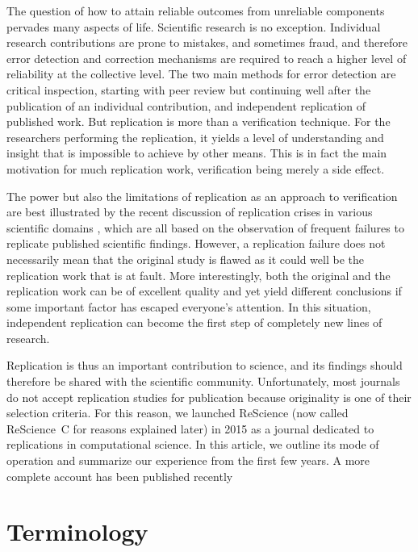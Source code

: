 \documentclass[runningheads]{llncs}
\begin{document}
The question of how to attain reliable outcomes from unreliable components pervades many aspects of life. Scientific research is no exception. Individual research contributions are prone to mistakes, and sometimes fraud, and therefore error detection and correction mechanisms are required to reach a higher level of reliability at the collective level. The two main methods for error detection are critical inspection, starting with peer review but continuing well after the publication of an individual contribution, and independent replication of published work. But replication is more than a verification technique. For the researchers performing the replication, it yields a level of understanding and insight that is impossible to achieve by other means. This is in fact the main motivation for much replication work, verification being merely a side effect.

The power but also the limitations of replication as an approach to verification are best illustrated by the recent discussion of replication crises in various scientific domains
\cite{IoannidisWhyMostPublished2005,Baker500scientistslift2016,Munafomanifestoreproduciblescience2017,IqbalReproducibleResearchPractices2016}, which are all based on the observation of frequent failures to replicate published scientific findings. However, a replication failure does not necessarily mean that the original study is flawed as it could well be the replication work that is at fault. More interestingly, both the original and the replication work can be of excellent quality and yet yield different conclusions if some important factor has escaped everyone's attention. In this situation, independent replication can become the first step of completely new lines of research.

Replication is thus an important contribution to science, and its findings should therefore be shared with the scientific community. Unfortunately, most journals do not accept replication studies for publication because originality is one of their selection criteria. For this reason, we launched ReScience  (now called ReScience~C for reasons explained later) in 2015 as a journal dedicated to replications in computational science. In this article, we outline its mode of operation and summarize our experience from the first few years. A more complete account has been published recently \cite{RougierSustainablecomputationalscience2017}

\section{Terminology}
\end{document}
